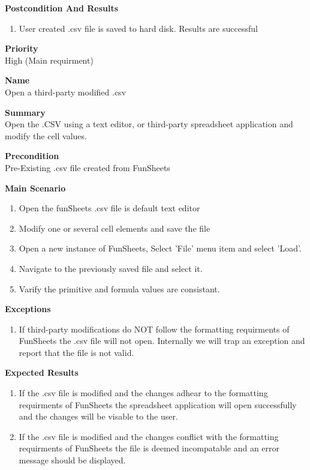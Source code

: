 \documentclass[12pt]{article}
\begin{document}
{\bf Postcondition And Results}\
\begin{enumerate}
\item User created .csv file is saved to hard disk. Results are successful
\end{enumerate}

\noindent
{\bf Priority}\\
High (Main requirment)
\noindent

\clearpage

\noindent
{\bf Name}\\
Open a third-party modified .csv

\noindent
{\bf Summary}\\
Open the .CSV using a text editor, or third-party spreadsheet application and modify the cell values.

\noindent
{\bf Precondition}\\
Pre-Existing .csv file created from FunSheets

\noindent
{\bf Main Scenario}\
\vspace*{-0.2in}
\begin{enumerate}
\item Open the funSheets .csv file is default text editor
\item Modify one or several cell elements and save the file
\item Open a new instance of FunSheets, Select 'File' menu item and select 'Load'.
\item Navigate to the previously saved file and select it.
\item Varify the primitive and formula values are consistant.
\end{enumerate}

\noindent
{\bf Exceptions}\
\begin{enumerate}
\item If third-party modifications do NOT follow the formatting requirments of FunSheets the .csv file will not open. Internally we will trap an exception and report that the file is not valid.
\end{enumerate}

{\bf Expected Results}\\
\begin{enumerate}
\item If the .csv file is modified and the changes adhear to the formatting requirments of FunSheets the spreadsheet application will open successfully and the changes will be visable to the user. 
\item If the .csv file is modified and the changes conflict with the formatting requirments of FunSheets the file is deemed incompatable and an error message should be displayed.
\end{enumerate}
\end{document}
